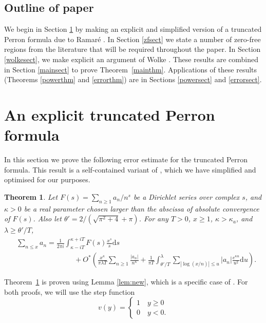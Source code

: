 \documentclass[reqno]{amsart}
\newtheorem{theorem}{Theorem}[section]
\numberwithin{equation}{section}
\theoremstyle{remark}
\begin{document}
\subsection{Outline of paper}
We begin in Section \ref{sectram} by making an explicit and simplified version of a truncated Perron formula due to Ramar\'e \cite{Ramare_16_Perron}. In Section \ref{zfsect} we state a number of zero-free regions from the literature that will be required throughout the paper. In Section \ref{wolkesect}, we make explicit an argument of Wolke \cite{Wolke_1983}. These results are combined in Section \ref{mainsect} to prove Theorem~\ref{mainthm}. Applications of these results (Theorems \ref{powerthm} and \ref{errorthm}) are in Sections \ref{powersect} and \ref{errorsect}.

\section{An explicit truncated Perron formula}\label{sectram}
In this section we prove the following error estimate for the truncated Perron formula. This result is a self-contained variant of \cite[Theorem 1.1]{Ramare_16_Perron}, which we have simplified and optimised for our purposes.

\begin{theorem}\label{thm:new-main}
    Let $F(s) = \sum_{n\geq 1} a_n/n^s$ be a Dirichlet series over complex $s$, and $\kappa>0$ be a real parameter chosen larger than the abscissa of absolute convergence of $F(s)$. Also let $\theta'=2/(\sqrt{\pi^2+4}+\pi)$. For any $T>0$, $x\geq 1$, $\kappa>\kappa_a$, and $\lambda\geq\theta'/T$,
    \begin{align*}
        &\sum_{n\leq x} a_n = \frac{1}{2\pi i} \int_{\kappa-iT}^{\kappa+iT} F(s) \frac{x^s}{s}\mathrm{d}s \\
        &\qquad\qquad\qquad\qquad + O^{*}\left(\frac{x^\kappa}{\pi \lambda T} \sum_{n\geq 1} \frac{|a_n|}{n^\kappa}  +  \frac{1}{\pi T}\int_{\theta'/T}^{\lambda} \sum_{|\log(x/n)| \leq u} |a_n| \frac{e^{\kappa u}}{u^2}\mathrm{d}u\right).
    \end{align*}
\end{theorem}

Theorem~\ref{thm:new-main} is proven using Lemma \ref{lem:new}, which is a specific case of \cite[Lem.~2.2]{Ramare_16_Perron}. For both proofs, we will use the step function $$v(y) = \begin{cases} 1 \quad y\geq 0 \\ 0 \quad y<0.\end{cases}$$ 
\end{document}
